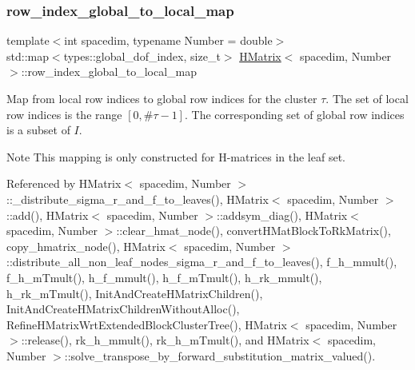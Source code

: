 \mbox{\label{classHMatrix_a4d64145335fc0521603b206a22a67578}} 
\subsubsection{\texorpdfstring{row\+\_\+index\+\_\+global\+\_\+to\+\_\+local\+\_\+map}{row\_index\_global\_to\_local\_map}}
{\footnotesize\ttfamily template$<$int spacedim, typename Number = double$>$ \\
std\+::map$<$types\+::global\+\_\+dof\+\_\+index, size\+\_\+t$>$ \hyperlink{classHMatrix}{H\+Matrix}$<$ spacedim, Number $>$\+::row\+\_\+index\+\_\+global\+\_\+to\+\_\+local\+\_\+map\hspace{0.3cm}{\ttfamily [private]}}

Map from local row indices to global row indices for the cluster $\tau$. The set of local row indices is the range $[0, \#\tau - 1]$. The corresponding set of global row indices is a subset of $I$.


\begin{DoxyDescription}
\item[Note ]This mapping is only constructed for H-\/matrices in the leaf set. 
\end{DoxyDescription}

Referenced by H\+Matrix$<$ spacedim, Number $>$\+::\+\_\+distribute\+\_\+sigma\+\_\+r\+\_\+and\+\_\+f\+\_\+to\+\_\+leaves(), H\+Matrix$<$ spacedim, Number $>$\+::add(), H\+Matrix$<$ spacedim, Number $>$\+::addsym\+\_\+diag(), H\+Matrix$<$ spacedim, Number $>$\+::clear\+\_\+hmat\+\_\+node(), convert\+H\+Mat\+Block\+To\+Rk\+Matrix(), copy\+\_\+hmatrix\+\_\+node(), H\+Matrix$<$ spacedim, Number $>$\+::distribute\+\_\+all\+\_\+non\+\_\+leaf\+\_\+nodes\+\_\+sigma\+\_\+r\+\_\+and\+\_\+f\+\_\+to\+\_\+leaves(), f\+\_\+h\+\_\+mmult(), f\+\_\+h\+\_\+m\+Tmult(), h\+\_\+f\+\_\+mmult(), h\+\_\+f\+\_\+m\+Tmult(), h\+\_\+rk\+\_\+mmult(), h\+\_\+rk\+\_\+m\+Tmult(), Init\+And\+Create\+H\+Matrix\+Children(), Init\+And\+Create\+H\+Matrix\+Children\+Without\+Alloc(), Refine\+H\+Matrix\+Wrt\+Extended\+Block\+Cluster\+Tree(), H\+Matrix$<$ spacedim, Number $>$\+::release(), rk\+\_\+h\+\_\+mmult(), rk\+\_\+h\+\_\+m\+Tmult(), and H\+Matrix$<$ spacedim, Number $>$\+::solve\+\_\+transpose\+\_\+by\+\_\+forward\+\_\+substitution\+\_\+matrix\+\_\+valued().

